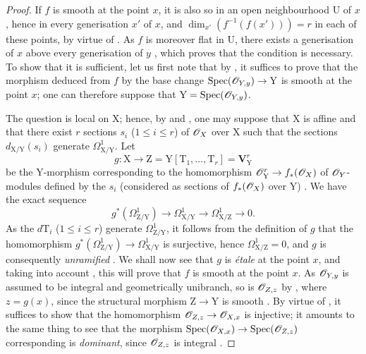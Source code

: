 \begin{proof}
If $f$ is smooth at the point $x$, it is also so in an open neighbourhood $\mathrm{U}$ of $x$, hence in every generisation $x'$ of $x$, and $\dim_{x'}(f^{-1}(f(x')))=r$ in each of these points, by virtue of .
As $f$ is moreover flat in $\mathrm{U}$, there exists a generisation of $x$ above every generisation of $y$ , which proves that the condition is necessary.
To show that it is sufficient, let us first note that by , it suffices to prove that the morphism deduced from $f$ by the base change $\operatorname{Spec}(\mathscr{O}_{Y,y})\to\mathrm{Y}$ is smooth at the point $x$; one can therefore suppose that $\mathrm{Y}=\operatorname{Spec}(\mathscr{O}_{Y,y})$.

The question is local on $\mathrm{X}$; hence, by  and , one may suppose that $\mathrm{X}$ is affine and that there exist $r$ sections $s_i$ ($1\leq i\leq r$) of $\mathscr{O}_X$ over $\mathrm{X}$ such that the sections $d_{\mathrm{X}/\mathrm{Y}}(s_i)$ generate $\Omega^1_{\mathrm{X}/\mathrm{Y}}$.
Let
\[
  g:\mathrm{X}\to\mathrm{Z}=\mathrm{Y}[\mathrm{T}_1,\ldots,\mathrm{T}_r]=\mathbf{V}_{\mathrm{Y}}^r
\]
be the $\mathrm{Y}$-morphism corresponding to the homomorphism $\mathscr{O}_{\mathrm{Y}}^r\to f_*(\mathscr{O}_X)$ of $\mathscr{O}_Y$-modules defined by the $s_i$ (considered as sections of $f_*(\mathscr{O}_X)$ over $\mathrm{Y}$) .
We have the exact sequence 
\[
  g^*(\Omega^1_{\mathrm{Z}/\mathrm{Y}})\to\Omega^1_{\mathrm{X}/\mathrm{Y}}\to\Omega^1_{\mathrm{X}/\mathrm{Z}}\to 0.
\]
As the $d\mathrm{T}_i$ ($1\leq i\leq r$) generate $\Omega^1_{\mathrm{Z}/\mathrm{Y}}$, it follows from the definition of $g$ that the homomorphism $g^*(\Omega^1_{\mathrm{Z}/\mathrm{Y}})\to\Omega^1_{\mathrm{X}/\mathrm{Y}}$ is surjective, hence $\Omega^1_{\mathrm{X}/\mathrm{Z}}=0$, and $g$ is consequently \emph{unramified} .
We shall now see that $g$ is \emph{\'etale} at the point $x$, and taking into account , this will prove that $f$ is smooth at the point $x$.
As $\mathscr{O}_{Y,y}$ is assumed to be integral and geometrically
unibranch, so is $\mathscr{O}_{Z,z}$ by , where $z=g(x)$, since the structural morphism $\mathrm{Z}\to\mathrm{Y}$ is smooth .
By virtue of , it suffices to show that the homomorphism $\mathscr{O}_{Z,z}\to\mathscr{O}_{X,x}$ is injective; it amounts to the same thing to see that the morphism $\operatorname{Spec}(\mathscr{O}_{X,x})\to\operatorname{Spec}(\mathscr{O}_{Z,z})$ corresponding is \emph{dominant}, since $\mathscr{O}_{Z,z}$ is integral .

\end{proof}
